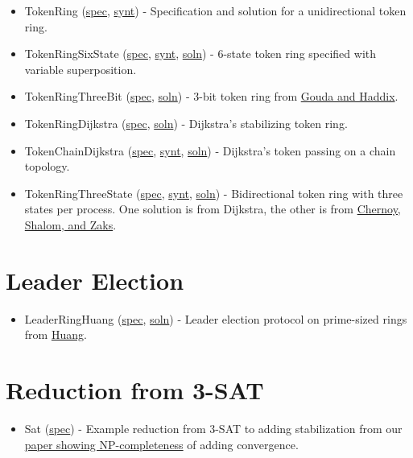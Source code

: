\begin{itemize}
\item TokenRing (\href{examplespec/TokenRing.prot}{spec}, \href{examplesynt/TokenRing.prot}{synt})
- Specification and solution for a unidirectional token ring.
\item TokenRingSixState (\href{examplespec/TokenRingSixState.prot}{spec}, \href{examplesynt/TokenRingSixState.prot}{synt}, \href{examplesoln/TokenRingSixState.prot}{soln})
- 6-state token ring specified with variable superposition.
\item TokenRingThreeBit (\href{examplespec/TokenRingThreeBit.prot}{spec}, \href{examplesoln/TokenRingThreeBit.prot}{soln})
- 3-bit token ring from \href{http://dx.doi.org/10.1006/jpdc.1996.0066}{Gouda and Haddix}.
\item TokenRingDijkstra (\href{examplespec/TokenRingDijkstra.prot}{spec}, \href{examplesoln/TokenRingDijkstra.prot}{soln})
- Dijkstra's stabilizing token ring.
\item TokenChainDijkstra (\href{examplespec/TokenChainDijkstra.prot}{spec}, \href{examplesynt/TokenChainDijkstra.prot}{synt}, \href{examplesoln/TokenChainDijkstra.prot}{soln})
- Dijkstra's token passing on a chain topology.
\item TokenRingThreeState (\href{examplespec/TokenRingThreeState.prot}{spec}, \href{examplesynt/TokenRingThreeState.prot}{synt}, \href{examplesoln/TokenRingThreeState.prot}{soln})
- Bidirectional token ring with three states per process.
One solution is from Dijkstra, the other is from \href{http://citeseerx.ist.psu.edu/viewdoc/summary?doi=10.1.1.153.6017}{Chernoy, Shalom, and Zaks}.
\end{itemize}

\section{Leader Election}

\begin{itemize}
\item LeaderRingHuang (\href{examplespec/LeaderRingHuang.prot}{spec}, \href{examplesoln/LeaderRingHuang.prot}{soln})
- Leader election protocol on prime-sized rings from \href{http://dx.doi.org/10.1145/169683.174161}{Huang}.
\end{itemize}

\section{Reduction from 3-SAT}

\begin{itemize}
\item Sat (\href{examplespec/Sat.prot}{spec})
- Example reduction from 3-SAT to adding stabilization from our \href{http://dx.doi.org/10.1007/978-3-642-40213-5_2}{paper showing NP-completeness} of adding convergence.
\end{itemize}



